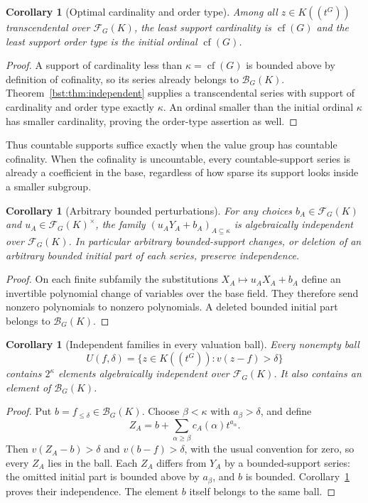 \documentclass[11pt,letterpaper]{article}
\newtheorem{corollary}[theorem]{Corollary}
\theoremstyle{definition}
\theoremstyle{remark}
\newcommand{\cof}{\operatorname{cf}}
\newcommand{\HH}[2]{#1((t^{#2}))}
\newcommand{\BB}[2]{\mathcal B_{#2}(#1)}
\newcommand{\FF}[2]{\mathcal F_{#2}(#1)}
\begin{document}
\begin{corollary}[Optimal cardinality and order type]\label{bst:cor:optimal}
Among all $z\in\HH KG$ transcendental over $\FF KG$, the least support
cardinality is $\cof(G)$ and the least support order type is the initial
ordinal $\cof(G)$.
\end{corollary}
\begin{proof}
A support of cardinality less than $\kappa=\cof(G)$ is bounded above by
definition of cofinality, so its series already belongs to $\BB KG$.
Theorem~\ref{bst:thm:independent} supplies a transcendental series with support
of cardinality and order type exactly $\kappa$. An ordinal smaller than
the initial ordinal $\kappa$ has smaller cardinality, proving the order-type
assertion as well.
\end{proof}

Thus countable supports suffice exactly when the value group has countable
cofinality. When the cofinality is uncountable, every countable-support
series is already a coefficient in the base, regardless of how sparse its
support looks inside a smaller subgroup.

\begin{corollary}[Arbitrary bounded perturbations]\label{bst:cor:perturb}
For any choices $b_A\in\FF KG$ and $u_A\in\FF KG^\times$, the family
$(u_AY_A+b_A)_{A\subseteq\kappa}$ is algebraically independent over
$\FF KG$. In particular arbitrary bounded-support changes, or deletion
of an arbitrary bounded initial part of each series, preserve independence.
\end{corollary}
\begin{proof}
On each finite subfamily the substitutions
$X_A\mapsto u_AX_A+b_A$ define an invertible polynomial change of variables
over the base field. They therefore send nonzero polynomials to nonzero
polynomials. A deleted bounded initial part belongs to $\BB KG$.
\end{proof}

\begin{corollary}[Independent families in every valuation ball]\label{bst:cor:balls}
Every nonempty ball
\[
 U(f,\delta)=\{z\in\HH KG:v(z-f)>\delta\}
\]
contains $2^\kappa$ elements algebraically independent over $\FF KG$.
It also contains an element of $\BB KG$.
\end{corollary}
\begin{proof}
Put $b=f_{\le\delta}\in\BB KG$. Choose $\beta<\kappa$ with
$a_\beta>\delta$, and define
\[
 Z_A=b+\sum_{\alpha\ge\beta}c_A(\alpha)t^{a_\alpha}.
\]
Then $v(Z_A-b)>\delta$ and $v(b-f)>\delta$, with the usual convention for
zero, so every $Z_A$ lies in the ball. Each $Z_A$ differs from $Y_A$ by a
bounded-support series: the omitted initial part is bounded above by
$a_\beta$, and $b$ is bounded. Corollary~\ref{bst:cor:perturb} proves their
independence. The element $b$ itself belongs to the same ball.
\end{proof}
\end{document}

